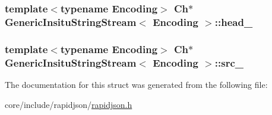 \subsubsection[{\texorpdfstring{head\+\_\+}{head_}}]{\setlength{\rightskip}{0pt plus 5cm}template$<$typename Encoding$>$ {\bf Ch}$\ast$ {\bf Generic\+Insitu\+String\+Stream}$<$ Encoding $>$\+::head\+\_\+}\hypertarget{structGenericInsituStringStream_af5a7116bdd9bfde5141c298a5b7566b0}{}\label{structGenericInsituStringStream_af5a7116bdd9bfde5141c298a5b7566b0}
\subsubsection[{\texorpdfstring{src\+\_\+}{src_}}]{\setlength{\rightskip}{0pt plus 5cm}template$<$typename Encoding$>$ {\bf Ch}$\ast$ {\bf Generic\+Insitu\+String\+Stream}$<$ Encoding $>$\+::src\+\_\+}\hypertarget{structGenericInsituStringStream_af3cc551dd07fcca39db84459f4d4e718}{}\label{structGenericInsituStringStream_af3cc551dd07fcca39db84459f4d4e718}


The documentation for this struct was generated from the following file\+:\begin{DoxyCompactItemize}
\item 
core/include/rapidjson/\hyperlink{rapidjson_8h}{rapidjson.\+h}\end{DoxyCompactItemize}
